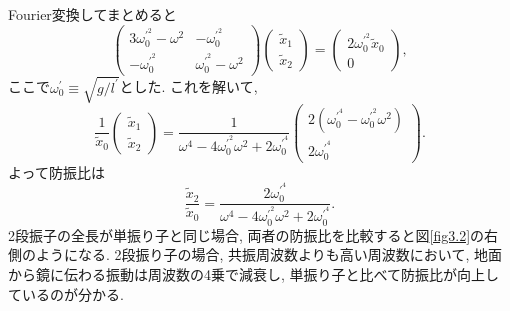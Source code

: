 Fourier変換してまとめると
\begin{equation}
\begin{pmatrix}
3\omega_0^{\prime^2}-\omega^2 & -\omega_0^{\prime^2}  \\
-\omega_0^{\prime^2} & \omega_0^{\prime^2}-\omega^2  
\end{pmatrix}
\begin{pmatrix}
\tilde{x}_1 \\
\tilde{x}_2
\end{pmatrix}
=
\begin{pmatrix}
2\omega_0^{\prime^2}\tilde{x}_0 \\
0
\end{pmatrix},
\end{equation}
ここで$\omega_0^{\prime}\equiv\sqrt{g/l^{\prime}}$とした. これを解いて, 
\begin{equation}
\frac{1}{\tilde{x}_0}
\begin{pmatrix}
\tilde{x}_1 \\
\tilde{x}_2
\end{pmatrix}
=\frac{1}{\omega^4-4\omega_0^{\prime^2}\omega^2+2\omega_0^{\prime^4}}
\begin{pmatrix}
2(\omega_0^{\prime^4}-\omega_0^{\prime^2}\omega^2)\\
2\omega_0^{\prime^4}
\end{pmatrix}.
\end{equation}
よって防振比は
\begin{equation}
\frac{\tilde{x}_2}{\tilde{x}_0}=\frac{2\omega_0^{\prime^4}}{\omega^4-4\omega_0^{\prime^2}\omega^2+2\omega_0^{\prime^4}}.
\end{equation}
\quad 2段振子の全長が単振り子と同じ場合, 両者の防振比を比較すると図\ref{fig3.2}の右側のようになる. 2段振り子の場合, 共振周波数よりも高い周波数において, 地面から鏡に伝わる振動は周波数の4乗で減衰し, 単振り子と比べて防振比が向上しているのが分かる. 
